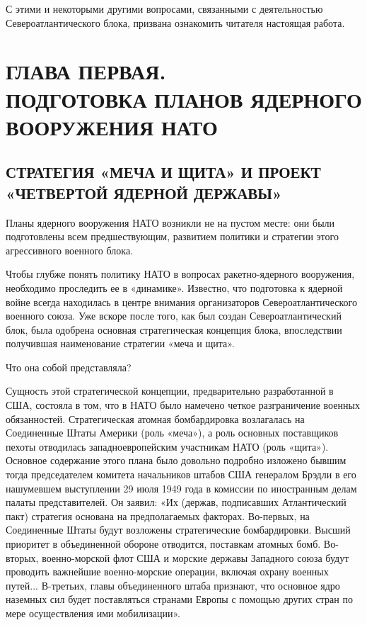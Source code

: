 \documentclass[12pt, a4paper, openany]{book}
\begin{document}
С этими и некоторыми другими вопросами, связанными с деятельностью Североатлантического блока, призвана ознакомить читателя настоящая работа.
	\newpage
	
	\section[Глава первая. ПОДГОТОВКА ПЛАНОВ ЯДЕРНОГО ВООРУЖЕНИЯ НАТО]{\center ГЛАВА ПЕРВАЯ.\\ \textbf{ПОДГОТОВКА ПЛАНОВ ЯДЕРНОГО ВООРУЖЕНИЯ НАТО}}	
	\subsection[Стратегия «меча и щита» и проект «четвертой ядерной державы»]{\center СТРАТЕГИЯ «МЕЧА И ЩИТА» И ПРОЕКТ «ЧЕТВЕРТОЙ ЯДЕРНОЙ ДЕРЖАВЫ»}

	Планы ядерного вооружения НАТО возникли не на пустом месте: они были подготовлены всем предшествующим, развитием политики и стратегии этого агрессивного военного блока.
	
	Чтобы глубже понять политику НАТО в вопросах ракетно-ядерного вооружения, необходимо проследить ее в «динамике». Известно, что подготовка к ядерной войне всегда находилась в центре внимания организаторов Североатлантического военного союза. Уже вскоре после того, как был создан Североатлантический блок, была одобрена основная стратегическая концепция блока, впоследствии получившая наименование стратегии «меча и щита».
	
	Что она собой представляла?
	
	Сущность этой стратегической концепции, предварительно разработанной в США, состояла в том, что в НАТО было намечено четкое разграничение военных обязанностей. Стратегическая атомная бомбардировка возлагалась на Соединенные Штаты Америки (роль «меча»), а роль основных поставщиков пехоты отводилась западноевропейским участникам НАТО (роль «щита»). Основное содержание этого плана было довольно подробно изложено бывшим тогда председателем комитета начальников штабов США генералом Брэдли в его нашумевшем выступлении 29 июля 1949 года в комиссии по иностранным делам палаты представителей. Он заявил: «Их (держав, подписавших Атлантический пакт) стратегия основана на предполагаемых факторах. Во-первых, на Соединенные Штаты будут возложены стратегические бомбардировки. Высший приоритет в объединенной обороне отводится, поставкам атомных бомб. Во-вторых, военно-морской флот США и морские державы Западного союза будут проводить важнейшие военно-морские операции, включая охрану военных путей... В-третьих, главы объединенного штаба признают, что основное ядро наземных сил будет поставляться странами Европы с помощью других стран по мере осуществления ими мобилизации».
	
\end{document}
